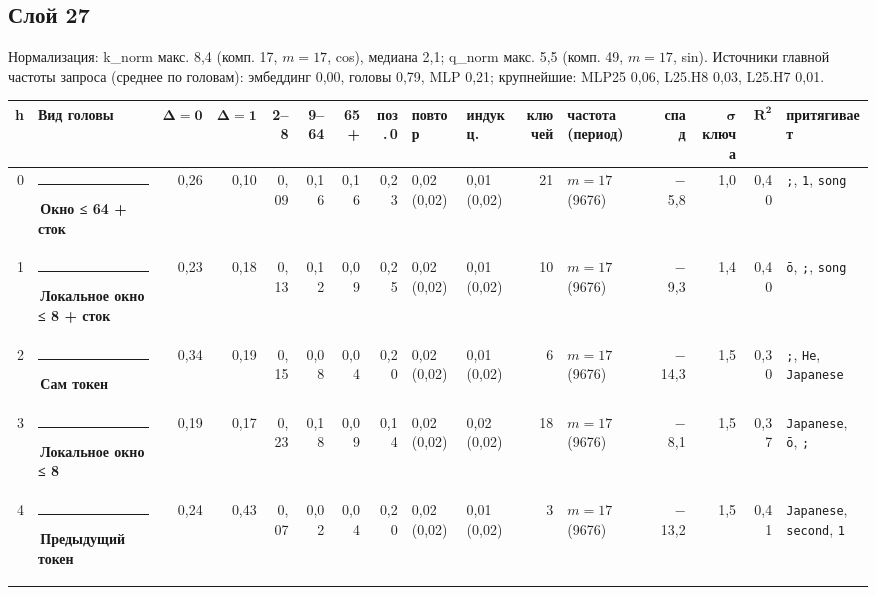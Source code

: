 \documentclass[10pt]{article}
\begin{document}
\par\vspace{0.4em}
\noindent\begin{minipage}{\linewidth}
\subsection*{Слой 27}
{\small\color{ink2} Нормализация: k\_norm макс. 8,4 (комп. 17, $m{=}17$, cos), медиана 2,1; q\_norm макс. 5,5 (комп. 49, $m{=}17$, sin). Источники главной частоты запроса (среднее по головам): эмбеддинг 0,00, головы 0,79, MLP 0,21; крупнейшие: MLP25 0,06, L25.H8 0,03, L25.H7 0,01.}
\begin{center}{\footnotesize\begin{tabular}{|r|l|r|r|r|r|r|r|l|l|r|l|r|r|r|l|}
\hline
\rowcolor{head}\textbf{h} & \textbf{Вид головы} & $\boldsymbol{\Delta{=}0}$ & $\boldsymbol{\Delta{=}1}$ & \textbf{2–8} & \textbf{9–64} & \textbf{65+} & \textbf{поз.\,0} & \textbf{повтор} & \textbf{индукц.} & \textbf{ключей} & \textbf{частота (период)} & \textbf{спад} & $\boldsymbol{\sigma}$ \textbf{ключа} & $\boldsymbol{R^2}$ & \textbf{притягивает} \\ \hline
0 & \textcolor[HTML]{EDA100}{\rule{0.62em}{0.62em}}\,\textbf{Окно ≤ 64 + сток} & 0,26 & 0,10 & 0,09 & 0,16 & 0,16 & 0,23 & 0,02 (0,02) & 0,01 (0,02) & 21 & $m{=}17$ (9676) & $-$5,8 & 1,0 & 0,40 & \texttt{\textvisiblespace{};}, \texttt{1}, \texttt{\textvisiblespace{}song} \\ \hline
1 & \textcolor[HTML]{1BAF7A}{\rule{0.62em}{0.62em}}\,\textbf{Локальное окно ≤ 8 + сток} & 0,23 & 0,18 & 0,13 & 0,12 & 0,09 & 0,25 & 0,02 (0,02) & 0,01 (0,02) & 10 & $m{=}17$ (9676) & $-$9,3 & 1,4 & 0,40 & \texttt{ō}, \texttt{\textvisiblespace{};}, \texttt{\textvisiblespace{}song} \\ \hline
2 & \textcolor[HTML]{2A78D6}{\rule{0.62em}{0.62em}}\,\textbf{Сам токен} & 0,34 & 0,19 & 0,15 & 0,08 & 0,04 & 0,20 & 0,02 (0,02) & 0,01 (0,02) & 6 & $m{=}17$ (9676) & $-$14,3 & 1,5 & 0,30 & \texttt{\textvisiblespace{};}, \texttt{\textvisiblespace{}He}, \texttt{\textvisiblespace{}Japanese} \\ \hline
3 & \textcolor[HTML]{1BAF7A}{\rule{0.62em}{0.62em}}\,\textbf{Локальное окно ≤ 8} & 0,19 & 0,17 & 0,23 & 0,18 & 0,09 & 0,14 & 0,02 (0,02) & 0,02 (0,02) & 18 & $m{=}17$ (9676) & $-$8,1 & 1,5 & 0,37 & \texttt{\textvisiblespace{}Japanese}, \texttt{ō}, \texttt{\textvisiblespace{};} \\ \hline
4 & \textcolor[HTML]{2A78D6}{\rule{0.62em}{0.62em}}\,\textbf{Предыдущий токен} & 0,24 & 0,43 & 0,07 & 0,02 & 0,04 & 0,20 & 0,02 (0,02) & 0,01 (0,02) & 3 & $m{=}17$ (9676) & $-$13,2 & 1,5 & 0,41 & \texttt{\textvisiblespace{}Japanese}, \texttt{\textvisiblespace{}second}, \texttt{1} \\ \hline

\end{tabular}}
\end{center}
\end{minipage}
\end{document}

